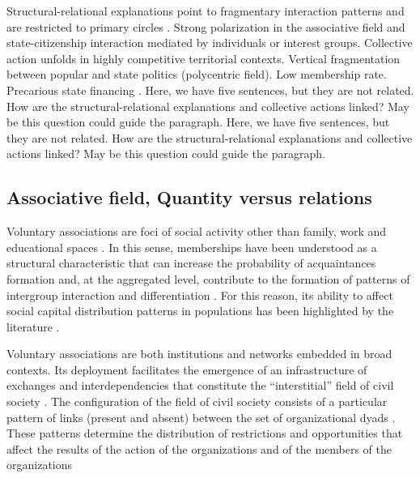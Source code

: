 Structural-relational explanations point to fragmentary interaction patterns and are restricted to primary circles \parencite{castells_globalizacion_2005}. Strong polarization in the associative field and state-citizenship interaction mediated by individuals or interest groups. Collective action unfolds in highly competitive territorial contexts. Vertical fragmentation between popular and state politics (polycentric field). Low membership rate. Precarious state financing \parencite{alenda__2013}. Here, we have five sentences, but they are not related. How are the structural-relational explanations and collective actions linked? May be this question could guide the paragraph. {\color{blue}Here, we have five sentences, but they are not related. How are the structural-relational explanations and collective actions linked? May be this question could guide the paragraph.}

\subsection{Associative field, Quantity versus relations}

Voluntary associations are foci of social activity other than family, work and educational spaces \parencite{knoke_associations_1986}. In this sense, memberships have been understood as a structural characteristic that can increase the probability of acquaintances formation \parencite{mcpherson_hypernetwork_1982} and, at the aggregated level, contribute to the formation of patterns of intergroup interaction and differentiation \parencite{blau_exchange_1986}. For this reason, its ability to affect social capital distribution patterns in populations has been highlighted by the literature \parencite{benton_uniters_2016,diani_social_1997,feld_focused_1981,glanville_voluntary_2004,son_social_2008,tindall_network_2012}.
\bigskip

Voluntary associations are both institutions and networks embedded in broad contexts. Its deployment facilitates the emergence of an infrastructure of exchanges and interdependencies that constitute the “interstitial” field of civil society \parencite{crossley_networks_2018,diani_cement_2015,lee_when_2016}. The configuration of the field of civil society consists of a particular pattern of links (present and absent) between the set of organizational dyads \parencite{kenis_how_2002}. These patterns determine the distribution of restrictions and opportunities that affect the results of the action of the organizations and of the members of the organizations \parencite{paxton_association_2007,son_social_2008,tindall_network_2012} 
\bigskip

